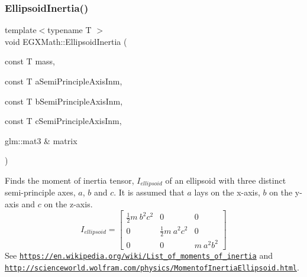 \subsubsection{\texorpdfstring{Ellipsoid\+Inertia()}{EllipsoidInertia()}\hspace{0.1cm}{\footnotesize\ttfamily [3/3]}}
{\footnotesize\ttfamily template$<$typename T $>$ \\
void E\+G\+X\+Math\+::\+Ellipsoid\+Inertia (\begin{DoxyParamCaption}\item[{const T}]{mass,  }\item[{const T}]{a\+Semi\+Principle\+Axis\+Inm,  }\item[{const T}]{b\+Semi\+Principle\+Axis\+Inm,  }\item[{const T}]{c\+Semi\+Principle\+Axis\+Inm,  }\item[{glm\+::mat3 \&}]{matrix }\end{DoxyParamCaption})}



Finds the moment of inertia tensor, $I_{ellipsoid}$ of an ellipsoid with three distinct semi-\/principle axes, $a$, $b$ and $c$. It is assumed that $a$ lays on the x-\/axis, $b$ on the y-\/axis and $c$ on the z-\/axis. \[ I_{ellipsoid}=\begin{bmatrix} \frac{1}{2}m\ b^2c^2 & 0 & 0\\ 0 & \frac{1}{2}m\ a^2c^2 & 0\\ 0 & 0 & m\ a^2b^2 \end{bmatrix} \] See \href{https://en.wikipedia.org/wiki/List_of_moments_of_inertia}{\tt https\+://en.\+wikipedia.\+org/wiki/\+List\+\_\+of\+\_\+moments\+\_\+of\+\_\+inertia} and \href{http://scienceworld.wolfram.com/physics/MomentofInertiaEllipsoid.html}{\tt http\+://scienceworld.\+wolfram.\+com/physics/\+Momentof\+Inertia\+Ellipsoid.\+html}. 


